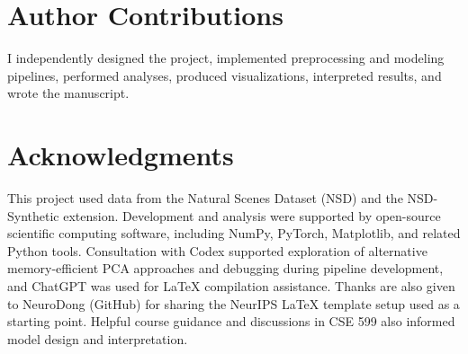 \documentclass[11pt]{article}
\begin{document}
\section{Author Contributions}
I independently designed the project, implemented preprocessing and modeling pipelines, performed analyses, produced visualizations, interpreted results, and wrote the manuscript.

\section{Acknowledgments}
This project used data from the Natural Scenes Dataset (NSD) and the NSD-Synthetic extension. Development and analysis were supported by open-source scientific computing software, including NumPy, PyTorch, Matplotlib, and related Python tools. Consultation with Codex supported exploration of alternative memory-efficient PCA approaches and debugging during pipeline development, and ChatGPT was used for LaTeX compilation assistance. Thanks are also given to NeuroDong (GitHub) for sharing the NeurIPS LaTeX template setup used as a starting point. Helpful course guidance and discussions in CSE 599 also informed model design and interpretation.

{\small


}
\end{document}
